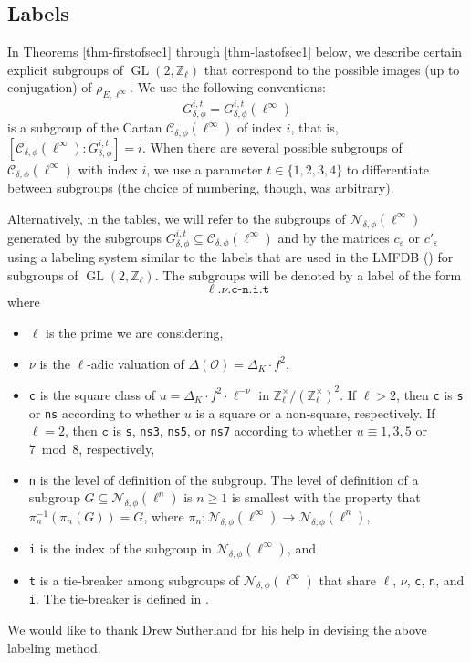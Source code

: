 \documentclass[11pt]{amsart}
\theoremstyle{definition}
\newcommand{\Z}{\mathbb Z}
\newcommand{\GL}{\operatorname{GL}}
\begin{document}
\subsection{Labels} \label{sec-labels} In Theorems \ref{thm-firstofsec1} through \ref{thm-lastofsec1} below, we describe certain explicit subgroups of $\GL(2,\Z_\ell)$ that correspond to the possible images (up to conjugation) of $\rho_{E,\ell^{\infty}}$. We use the following conventions:
$$G_{\delta,\phi}^{i,t}=G_{\delta,\phi}^{i,t}(\ell^\infty)$$
is a subgroup of the Cartan $\mathcal{C}_{\delta,\phi}(\ell^{\infty})$ of index $i$, that is, $[\mathcal{C}_{\delta,\phi}(\ell^{\infty}) : G_{\delta,\phi}^{i,t}]=i$. When there are several possible subgroups of $\mathcal{C}_{\delta,\phi}(\ell^{\infty})$ with index $i$, we use a parameter $t \in \{1,2,3,4\}$ to differentiate between subgroups (the choice of numbering, though, was arbitrary).

Alternatively, in the tables, we will refer to the subgroups of $\mathcal{N}_{\delta, \phi}(\ell^{\infty})$ generated by the subgroups $G_{\delta,\phi}^{i,t} \subseteq \mathcal{C}_{\delta, \phi}(\ell^{\infty})$ and by the matrices $c_{\varepsilon}$ or $c'_{\varepsilon}$ using a labeling system similar to the labels that are used in the LMFDB (\cite{lmfdb}) for subgroups of $\GL(2,\Z_\ell)$. The subgroups will be denoted by a label of the form
$$\ell\texttt{.}\nu\texttt{.c-n.i.t}$$
where
\begin{itemize}
    \item $\ell$ is the prime we are considering,
    \item $\nu$ is the $\ell$-adic valuation of $\Delta(\mathcal{O})=\Delta_K\cdot f^2$,
    \item \texttt{c} is the square class of $u=\Delta_K\cdot f^2\cdot \ell^{-\nu}$ in $\Z_\ell^\times/(\Z_\ell^\times)^2$. If $\ell>2$, then \texttt{c} is \texttt{s} or \texttt{ns} according to whether $u$ is a square or a non-square, respectively. If $\ell=2$, then $\texttt{c}$ is \texttt{s}, \texttt{ns3}, \texttt{ns5}, or \texttt{ns7} according to whether $u\equiv 1,3,5$ or $7\bmod 8$, respectively,
    \item \texttt{n} is the level of definition of the subgroup. The level of definition of a subgroup $G\subseteq \mathcal{N}_{\delta,\phi}(\ell^n)$ is $n\geq 1$ is smallest with the property that $\pi_n^{-1}(\pi_n(G))=G$, where $\pi_n\colon \mathcal{N}_{\delta,\phi}(\ell^{\infty}) \to \mathcal{N}_{\delta,\phi}(\ell^n)$,
    \item \texttt{i} is the index of the subgroup in $\mathcal{N}_{\delta,\phi}(\ell^{\infty})$, and
    \item \texttt{t} is a tie-breaker among subgroups of $\mathcal{N}_{\delta,\phi}(\ell^{\infty})$ that share $\ell$, $\nu$, \texttt{c}, \texttt{n}, and \texttt{i}. The tie-breaker is defined in \cite[Section 2.4]{elladic}.
\end{itemize} 
We would like to thank Drew Sutherland for his help in devising the above labeling method.
\end{document}
